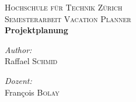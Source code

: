 \begin{titlepage}
 
\begin{center}
 
  
\textsc{\LARGE Hochschule f\"ur Technik Z\"urich}\\[1.5cm]
 
\textsc{\Large Semesterarbeit Vacation Planner}\\[1.5cm]
 { \huge \bfseries Projektplanung}\\[5cm]
 \begin{minipage}{0.4\textwidth}
\begin{flushleft} \large
\emph{Author:}\\
Raffael \textsc{Schmid}
\end{flushleft}
\end{minipage}
\begin{minipage}{0.4\textwidth}
\begin{flushright} \large
\emph{Dozent:} \\
Fran\c cois \textsc{Bolay}
\end{flushright}
\end{minipage}
\vfill
\end{center}
\end{titlepage}
